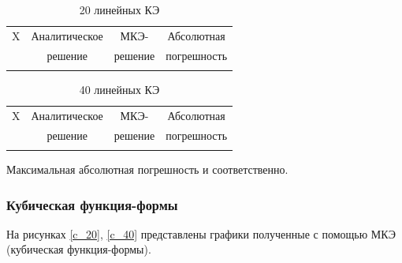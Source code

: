 \begin{table}[H]
\centering
\begin{tabular}{|c|c|c|c|}
\hline
X & Аналитическое & МКЭ-    & Абсолютная \\
  & решение       & решение & погрешность \\
\hline
 \\
\hline
\end{tabular}
\caption{20 линейных КЭ}
\label{table:lin_20}
\end{table}

\begin{table}[H]
\centering
\begin{tabular}{|c|c|c|c|}
\hline
X & Аналитическое & МКЭ-    & Абсолютная \\
  & решение       & решение & погрешность \\
\hline
 \\
\hline
\end{tabular}
\caption{40 линейных КЭ}
\label{table:lin_40}
\end{table}

Максимальная абсолютная погрешность  и  соответственно.

\subsubsection{Кубическая функция-формы}

На рисунках \ref{c_20}, \ref{c_40} представлены графики полученные с помощью МКЭ (кубическая функция-формы).

